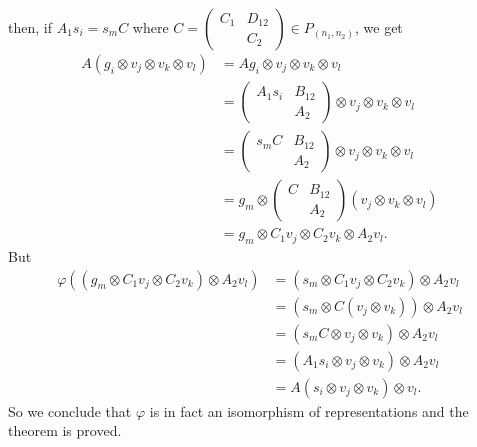 then, if $A_1s_i=s_mC$ where $C=\left(\begin{smallmatrix}
    C_1&D_{12}\\
    & C_2
\end{smallmatrix}\right)\in P_{(n_1,n_2)}$, we get
\begin{equation}
    \begin{split}
        A(g_i\otimes v_j\otimes v_k\otimes v_l)
        &=Ag_i\otimes v_j\otimes v_k\otimes v_l\\
        &=\begin{pmatrix}
            A_1s_i&B_{12}\\
            & A_2
        \end{pmatrix}\otimes v_j\otimes v_k\otimes v_l\\
        &=\begin{pmatrix}
            s_mC&B_{12}\\
            & A_2
        \end{pmatrix}\otimes v_j\otimes v_k\otimes v_l\\
        &=g_m\otimes
        \begin{pmatrix}
           C&B_{12}\\
           &A_2
        \end{pmatrix}(v_j\otimes v_k\otimes v_l)\\
        &=g_m\otimes
        C_1v_j\otimes C_2v_k\otimes A_2v_l.
    \end{split}
\end{equation}
But 
\begin{equation}
    \begin{split}
        \varphi((g_m\otimes
        C_1v_j\otimes C_2v_k)\otimes A_2v_l)
        &=(s_m\otimes C_1v_j\otimes C_2v_k)\otimes A_2v_l\\
        &=(s_m\otimes C(v_j\otimes v_k))\otimes A_2 v_l\\
        &=(s_mC\otimes v_j\otimes v_k)\otimes A_2v_l\\
        &=(A_1s_i\otimes v_j\otimes v_k)\otimes A_2v_l\\
        &=A(s_i\otimes v_j\otimes v_k)\otimes v_l.
    \end{split}
\end{equation}
So we conclude that $\varphi$ is in fact an isomorphism of representations and the theorem is proved.\par


